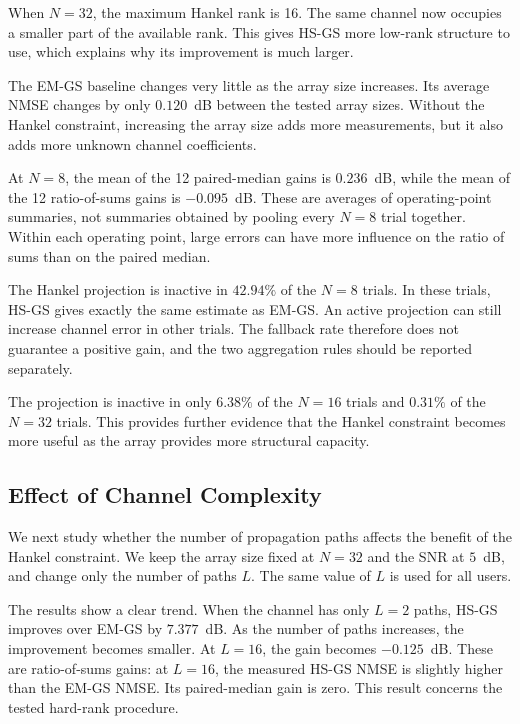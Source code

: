 \documentclass[journal]{IEEEtran}
\begin{document}
When $N=32$, the maximum Hankel rank is 16. The same channel now occupies
a smaller part of the available rank. This gives HS-GS more low-rank
structure to use, which explains why its improvement is much larger.

The EM-GS baseline changes very little as the array size increases. Its
average NMSE changes by only $0.120$~dB between the tested array sizes.
Without the Hankel constraint, increasing the array size adds more
measurements, but it also adds more unknown channel coefficients.

At $N=8$, the mean of the 12 paired-median gains is $0.236$~dB, while
the mean of the 12 ratio-of-sums gains is $-0.095$~dB. These are averages
of operating-point summaries, not summaries obtained by pooling every
$N=8$ trial together. Within each operating point, large errors can have
more influence on the ratio of sums than on the paired median.

The Hankel projection is inactive in $42.94\%$ of the $N=8$ trials. In
these trials, HS-GS gives exactly the same estimate as EM-GS. An active
projection can still increase channel error in other trials. The fallback
rate therefore does not guarantee a positive gain, and the two aggregation
rules should be reported separately.

The projection is inactive in only $6.38\%$ of the $N=16$ trials and
$0.31\%$ of the $N=32$ trials. This provides further evidence that the
Hankel constraint becomes more useful as the array provides more structural
capacity.

\subsection{Effect of Channel Complexity}
\label{sec:pathcount}

We next study whether the number of propagation paths affects the benefit
of the Hankel constraint. We keep the array size fixed at $N=32$ and the
SNR at $5$~dB, and change only the number of paths $L$. The same value of
$L$ is used for all users.

The results show a clear trend. When the channel has only $L=2$ paths,
HS-GS improves over EM-GS by $7.377$~dB. As the number of paths increases,
the improvement becomes smaller. At $L=16$, the gain becomes
$-0.125$~dB. These are ratio-of-sums gains: at $L=16$, the measured
HS-GS NMSE is slightly higher than the EM-GS NMSE. Its paired-median
gain is zero. This result concerns the tested hard-rank procedure.
\end{document}
